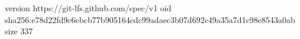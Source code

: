 version https://git-lfs.github.com/spec/v1
oid sha256:e78d22fd9c6ebcb77b905164cdc99adaec3b07d692c49a35a7d1c98e8543a0ab
size 337
